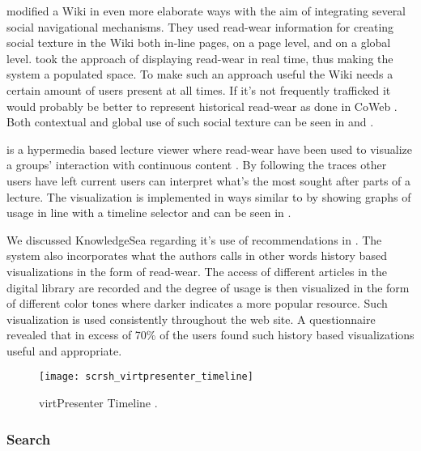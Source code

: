 \citet{xu06} modified a Wiki in even more elaborate ways
with the aim of integrating several social navigational mechanisms.
They used read-wear information for creating social
texture in the Wiki both in-line pages, on a page level, and on a global
level. \citeauthor{xu06} took the approach of displaying read-wear in real
time, thus making the system a populated space. To make such an approach
useful the Wiki needs a certain amount of users present at all times. If
it's not frequently trafficked it would probably be better to represent
historical read-wear as done in CoWeb \citep[]{dieberger00a}. Both
contextual and global use of such social texture can be seen in
 and .

 is a hypermedia based lecture viewer where read-wear
have been used to visualize a groups' interaction with continuous content
\citep{mertens06}. By following the traces other users have left current users
can interpret what's the most sought after parts of a lecture. The
visualization is implemented in ways similar to \citet{hill92} by showing
graphs of usage in line with a timeline selector and can be seen in
.

We discussed KnowledgeSea regarding it's use of recommendations in
.
The system also incorporates what the authors calls
\citep[]{brusilovsky05}\dash{}in other words history based
visualizations in the form of read-wear. The access of different articles in
the digital library are recorded and the degree of usage is then visualized in
the form of different color tones where darker indicates a more popular
resource. Such visualization is used consistently throughout the web site. A
questionnaire revealed that in excess of 70\%
\citeyearpar[p.15]{brusilovsky05} of the users
found such history based visualizations useful and appropriate.

\begin{figure}
  \centering
  \texttt{[image: scrsh\_virtpresenter\_timeline]}
  \caption[virtPresenter Timeline]{
    virtPresenter Timeline \citep[]{mertens06}.
  }
  \label{figure:scrsh.virtpresenter.timeline}
\end{figure}


\subsubsection{Search}


